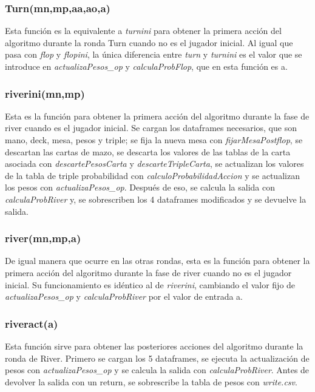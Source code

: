 \subsubsection{Turn(mn,mp,aa,ao,a)}

Esta función es la equivalente a  \textit{turnini} para obtener la primera acción del algoritmo durante la ronda Turn cuando no es el jugador inicial.
Al igual que pasa con  \textit{flop} y  \textit{flopini}, la única diferencia entre  \textit{turn} y  \textit{turnini} es el valor que se introduce en  \textit{actualizaPesos\_op} y  \textit{calculaProbFlop}, que en esta función es a.

\subsubsection{riverini(mn,mp)}

Esta es la función para obtener la primera acción del algoritmo durante la fase de river cuando es el jugador inicial.
Se cargan los dataframes necesarios, que son mano, deck, mesa, pesos y triple; se fija la nueva mesa con  \textit{fijarMesaPostflop}, se descartan las cartas de mazo, se descarta los valores de las tablas de la carta asociada con  \textit{descartePesosCarta} y  \textit{descarteTripleCarta},  se actualizan los valores de la tabla de triple probabilidad con  \textit{calculoProbabilidadAccion} y se actualizan los pesos con  \textit{actualizaPesos\_op}.
Después de eso, se calcula la salida con  \textit{calculaProbRiver} y, se sobrescriben los 4 dataframes modificados y se devuelve la salida.


\subsubsection{river(mn,mp,a)}

De igual manera que ocurre en las otras rondas, esta es la función para obtener la primera acción del algoritmo durante la fase de river cuando no es el jugador inicial.
Su funcionamiento es idéntico al de  \textit{riverini}, cambiando el valor fijo de \textit{actualizaPesos\_op} y  \textit{calculaProbRiver} por el valor de entrada a.



\subsubsection{riveract(a)}

Esta función sirve para obtener las posteriores acciones del algoritmo durante la ronda de River.
Primero se cargan los 5 dataframes, se ejecuta la actualización de pesos con  \textit{actualizaPesos\_op} y se calcula la salida con  \textit{calculaProbRiver}.
Antes de devolver la salida con un return, se sobrescribe la tabla de pesos con  \textit{write.csv}.


